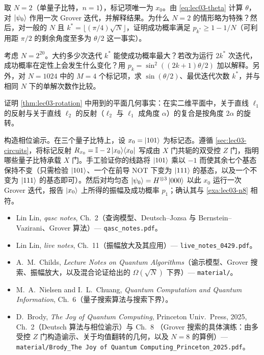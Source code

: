 \begin{exercise}\label{ex:lec03-5}
取 $N=2$（单量子比特，$n=1$），标记项唯一为 $x_0$。由 \eqref{eq:lec03-theta} 计算 $\theta$，对 $\ket{\psi_0}$ 作用一次 Grover 迭代，并解释结果。为什么 $N=2$ 的情形略为特殊？然后，对一般的 $N$ 且 $k^{\ast}=\lfloor(\pi/4)\sqrt N\rfloor$，证明成功概率满足 $p_{k^{\ast}}\ge1-1/N$（可利用距 $\pi/2$ 的剩余角度至多为 $\theta/2$ 这一事实）。
\end{exercise}

\begin{exercise}\label{ex:lec03-6}
考虑 $N=2^{20}$。大约多少次迭代 $k^{\ast}$ 能使成功概率最大？若改为运行 $2k^{\ast}$ 次迭代，成功概率在定性上会发生什么变化？用 $p_k=\sin^2((2k+1)\theta/2)$ 加以解释。另外，对 $N=1024$ 中的 $M=4$ 个标记项，求 $\sin(\theta/2)$、最优迭代次数 $k^{\ast}$，并与相同 $N$ 下的单解次数作比较。
\end{exercise}

\begin{exercise}\label{ex:lec03-7}
证明 \cref{thm:lec03-rotation} 中用到的平面几何事实：在实二维平面中，关于直线 $\ell_1$ 的反射与关于直线 $\ell_2$ 的反射（$\ell_2$ 与 $\ell_1$ 成角度 $\alpha$）的复合是按角度 $2\alpha$ 的旋转。
\end{exercise}

\begin{exercise}\label{ex:lec03-8}
构造相位谕示。在三个量子比特上，设 $x_0=\ket{101}$ 为标记态。遵循 \cref{sec:lec03-circuits}，将标记反射
$R_{x_0}=\mathbb{I}-2\ket{x_0}\!\bra{x_0}$ 写成由 $X$ 门共轭的双受控 $Z$ 门，指明哪些量子比特承载 $X$ 门。手工验证你的线路将 $\ket{101}$ 乘以 $-1$ 而使其余七个基态保持不变（只需检验 $\ket{101}$、一个在前导 NOT 下变为 $\ket{111}$ 的基态，以及一个不变为 $\ket{111}$ 的基态即可）。然后对均匀态 $\ket{\psi_0}=H^{\otimes3}\ket{000}$ 以此 $x_0$ 运行一次 Grover 迭代，报告 $\ket{x_0}$ 上所得的振幅及成功概率 $p_1$；确认其与 \cref{exa:lec03-n8} 相符。
\end{exercise}

\readingsection
\begin{itemize}[leftmargin=1.4em]
  \item Lin Lin, \emph{qasc notes}, Ch.~2（查询模型、Deutsch--Jozsa 与
        Bernstein--Vazirani、Grover 算法）--- \texttt{qasc\_notes.pdf}。
  \item Lin Lin, \emph{live notes}, Ch.~11（振幅放大及其应用）--- \texttt{live\_notes\_0429.pdf}。
  \item A.~M.~Childs, \emph{Lecture Notes on Quantum Algorithms}（谕示模型、Grover 搜索、振幅放大，以及混合论证给出的
        $\Omega(\sqrt N)$ 下界）--- \texttt{material/}。
  \item M.~A.~Nielsen and I.~L.~Chuang, \emph{Quantum Computation and Quantum
        Information}, Ch.~6（量子搜索算法与搜索下界）。
  \item D.~Brody, \emph{The Joy of Quantum Computing}, Princeton Univ.\ Press,
        2025, Ch.~2（Deutsch 算法与相位谕示）与 Ch.~8
        （Grover 搜索的具体演练：由多受控 $Z$ 门构造谕示、关于均值翻转的几何，以及
        $N=8$ 的算例）---
        \texttt{material/Brody\_The\ Joy\ of\ Quantum\ Computing\_Princeton\_2025.pdf}。
\end{itemize}
